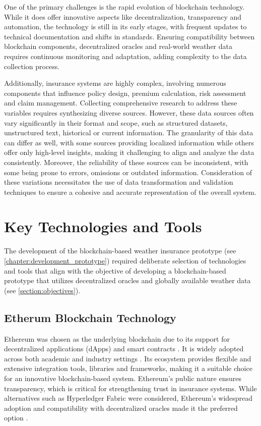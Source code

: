 One of the primary challenges is the rapid evolution of blockchain technology. While it does offer innovative aspects like decentralization, transparency and automation, the technology is still in its early stages, with frequent updates to technical documentation and shifts in standards. Ensuring compatibility between blockchain components, decentralized oracles and real-world weather data requires continuous monitoring and adaptation, adding complexity to the data collection process.

Additionally, insurance systems are highly complex, involving numerous components that influence policy design, premium calculation, risk assessment and claim management. Collecting comprehensive research to address these variables requires synthesizing diverse sources. However, these data sources often vary significantly in their format and scope, such as structured datasets, unstructured text, historical or current information. The granularity of this data can differ as well, with some sources providing localized information while others offer only high-level insights, making it challenging to align and analyze the data consistently. Moreover, the reliability of these sources can be inconsistent, with some being prone to errors, omissions or outdated information. Consideration of these variations necessitates the use of data transformation and validation techniques to ensure a cohesive and accurate representation of the overall system.

\section{Key Technologies and Tools}\label{section:prototype_development}
The development of the blockchain-based weather insurance prototype (see \cref{chapter:development_prototype}) required deliberate selection of technologies and tools that align with the objective of developing a blockchain-based prototype that utilizes decentralized oracles and globally available weather data (see \cref{section:objectives}).

\subsection{Etherum Blockchain Technology}
Ethereum was chosen as the underlying blockchain due to its support for decentralized applications (dApps) and smart contracts \autocite{Oliva2020An}. It is widely adopted across both academic and industry settings \autocite{Kosmarski2020Blockchain}. Its ecosystem provides flexible and extensive integration tools, libraries and frameworks, making it a suitable choice for an innovative blockchain-based system. Ethereum's public nature ensures transparency, which is critical for strengthening trust in insurance systems. While alternatives such as Hyperledger Fabric were considered, Ethereum's widespread adoption and compatibility with decentralized oracles made it the preferred option \autocite{ferreira2021regulating}.


